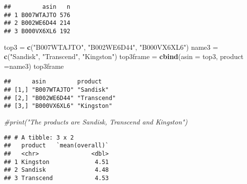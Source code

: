 \documentclass[
]{article}
\newenvironment{Shaded}{\begin{snugshade}}{\end{snugshade}}
\newcommand{\CommentTok}[1]{\textcolor[rgb]{0.56,0.35,0.01}{\textit{#1}}}
\newcommand{\DataTypeTok}[1]{\textcolor[rgb]{0.13,0.29,0.53}{#1}}
\newcommand{\KeywordTok}[1]{\textcolor[rgb]{0.13,0.29,0.53}{\textbf{#1}}}
\newcommand{\NormalTok}[1]{#1}
\newcommand{\OperatorTok}[1]{\textcolor[rgb]{0.81,0.36,0.00}{\textbf{#1}}}
\newcommand{\OtherTok}[1]{\textcolor[rgb]{0.56,0.35,0.01}{#1}}
\newcommand{\StringTok}[1]{\textcolor[rgb]{0.31,0.60,0.02}{#1}}
\begin{document}
\begin{verbatim}
##         asin   n
## 1 B007WTAJTO 576
## 2 B002WE6D44 214
## 3 B000VX6XL6 192
\end{verbatim}

\begin{Shaded}
\begin{Highlighting}[]
\NormalTok{top3 =}\StringTok{ }\KeywordTok{c}\NormalTok{(}\StringTok{"B007WTAJTO"}\NormalTok{, }\StringTok{"B002WE6D44"}\NormalTok{, }\StringTok{"B000VX6XL6"}\NormalTok{)}
\NormalTok{name3 =}\StringTok{ }\KeywordTok{c}\NormalTok{(}\StringTok{"Sandisk"}\NormalTok{, }\StringTok{"Transcend"}\NormalTok{, }\StringTok{"Kingston"}\NormalTok{)}
\NormalTok{top3frame =}\StringTok{ }\KeywordTok{cbind}\NormalTok{(}\DataTypeTok{asin =}\NormalTok{ top3, }\DataTypeTok{product =}\NormalTok{name3)}
\NormalTok{top3frame}
\end{Highlighting}
\end{Shaded}

\begin{verbatim}
##      asin         product    
## [1,] "B007WTAJTO" "Sandisk"  
## [2,] "B002WE6D44" "Transcend"
## [3,] "B000VX6XL6" "Kingston"
\end{verbatim}

\begin{Shaded}
\begin{Highlighting}[]
\CommentTok{#print("The products are Sandisk, Transcend and Kingston")}
\end{Highlighting}
\end{Shaded}

\begin{Shaded}
\end{Shaded}

\begin{verbatim}
## # A tibble: 3 x 2
##   product   `mean(overall)`
##   <chr>               <dbl>
## 1 Kingston             4.51
## 2 Sandisk              4.48
## 3 Transcend            4.53
\end{verbatim}
\end{document}
